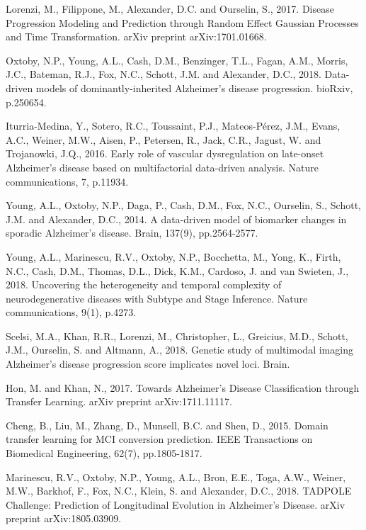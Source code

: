 \documentclass{llncs}
\begin{document}

\begin{thebibliography}{5}

Lorenzi, M., Filippone, M., Alexander, D.C. and Ourselin, S., 2017. Disease Progression Modeling and Prediction through Random Effect Gaussian Processes and Time Transformation. arXiv preprint arXiv:1701.01668.


Oxtoby, N.P., Young, A.L., Cash, D.M., Benzinger, T.L., Fagan, A.M., Morris, J.C., Bateman, R.J., Fox, N.C., Schott, J.M. and Alexander, D.C., 2018. Data-driven models of dominantly-inherited Alzheimer's disease progression. bioRxiv, p.250654.


Iturria-Medina, Y., Sotero, R.C., Toussaint, P.J., Mateos-Pérez, J.M., Evans, A.C., Weiner, M.W., Aisen, P., Petersen, R., Jack, C.R., Jagust, W. and Trojanowki, J.Q., 2016. Early role of vascular dysregulation on late-onset Alzheimer's disease based on multifactorial data-driven analysis. Nature communications, 7, p.11934.


Young, A.L., Oxtoby, N.P., Daga, P., Cash, D.M., Fox, N.C., Ourselin, S., Schott, J.M. and Alexander, D.C., 2014. A data-driven model of biomarker changes in sporadic Alzheimer's disease. Brain, 137(9), pp.2564-2577.


Young, A.L., Marinescu, R.V., Oxtoby, N.P., Bocchetta, M., Yong, K., Firth, N.C., Cash, D.M., Thomas, D.L., Dick, K.M., Cardoso, J. and van Swieten, J., 2018. Uncovering the heterogeneity and temporal complexity of neurodegenerative diseases with Subtype and Stage Inference. Nature communications, 9(1), p.4273.

Scelsi, M.A., Khan, R.R., Lorenzi, M., Christopher, L., Greicius, M.D., Schott, J.M., Ourselin, S. and Altmann, A., 2018. Genetic study of multimodal imaging Alzheimer's disease progression score implicates novel loci. Brain.


Hon, M. and Khan, N., 2017. Towards Alzheimer's Disease Classification through Transfer Learning. arXiv preprint arXiv:1711.11117.


Cheng, B., Liu, M., Zhang, D., Munsell, B.C. and Shen, D., 2015. Domain transfer learning for MCI conversion prediction. IEEE Transactions on Biomedical Engineering, 62(7), pp.1805-1817.

Marinescu, R.V., Oxtoby, N.P., Young, A.L., Bron, E.E., Toga, A.W., Weiner, M.W., Barkhof, F., Fox, N.C., Klein, S. and Alexander, D.C., 2018. TADPOLE Challenge: Prediction of Longitudinal Evolution in Alzheimer's Disease. arXiv preprint arXiv:1805.03909.


\end{thebibliography}
\end{document}
